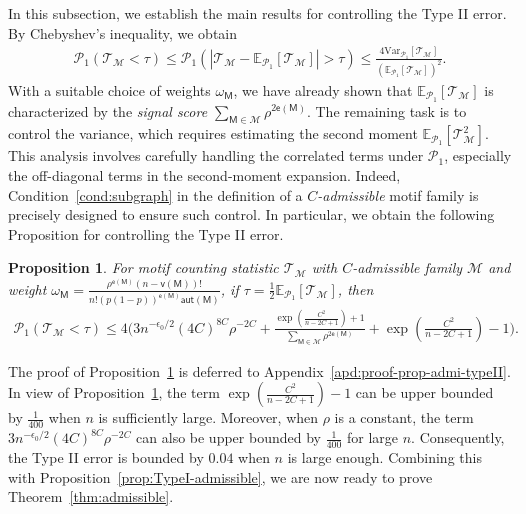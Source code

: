 \documentclass[letterpaper,11pt]{article}
\newtheorem{proposition}{Proposition}
\theoremstyle{definition}
\newcommand{\maM}{\mathcal{M}}
\newcommand{\maP}{\mathcal{P}}
\newcommand{\maT}{\mathcal{T}}
\newcommand{\en}{\mathsf{{e}}}
\newcommand{\vn}{\mathsf{{v}}}
\newcommand{\pth}[1]{\left( #1 \right)}
\newcommand{\qth}[1]{\left[ #1 \right]}
\newcommand{\sfM}{{\mathsf{M}}}
\newcommand{\aut}{\mathsf{aut}}
\def\var{\mathrm{Var}}
\def\E{\mathbb{E}}
\begin{document}
In this subsection, we establish the main results for controlling the Type II error. By Chebyshev's inequality, we obtain \begin{align*}
    \maP_1\pth{\maT_\maM<\tau} \le \maP_1\pth{\left| \maT_\maM-\E_{\maP_1}\qth{\maT_\maM}\right|>\tau}\le \frac{4\var_{\maP_1}\qth{\maT_\maM}}{\pth{\E_{\maP_1}\qth{\maT_\maM}}^2}.
\end{align*}
With a suitable choice of weights $\omega_\sfM$, we have already shown that $\E_{\maP_1}[\maT_\maM]$ is characterized by the \emph{signal score} $\sum_{\sfM\in \maM} \rho^{2\en(\sfM)}$. The remaining task is to control the variance, which requires estimating the second moment $\E_{\maP_1}[\maT_\maM^2]$. This analysis involves carefully handling the correlated terms under $\maP_1$, especially the off-diagonal terms in the second-moment expansion. Indeed, Condition~\ref{cond:subgraph} in the definition of a \emph{$C$-admissible} motif family is precisely designed to ensure such control. In particular, we obtain the following Proposition for controlling the Type II error.

\begin{proposition}\label{prop:admissible-TypeII}
    For motif counting statistic $\maT_\maM$ with \emph{$C$-admissible}  family $\maM$ and weight $\omega_\sfM = \frac{\rho^{\en(\sfM)}(n-\vn(\sfM))!}{n!(p(1-p))^{\en(\sfM)}\aut(\sfM)}$, if $\tau = \frac{1}{2}\E_{\maP_1}\qth{\maT_\maM}$, then \begin{align*}
        \maP_1\pth{\maT_\maM<\tau}\le 4\Bigg(3n^{-\epsilon_0/2}(4C)^{8C}\rho^{-2C}+\frac{\exp\pth{\frac{C^2}{n-2C+1}}+1}{\sum_{\sfM\in \maM}\rho^{2\en(\sfM)}}+\exp\pth{\frac{C^2}{n-2C+1}}-1\Bigg).
    \end{align*}
\end{proposition}
The proof of Proposition~\ref{prop:admissible-TypeII} is deferred to Appendix~\ref{apd:proof-prop-admi-typeII}. In view of Proposition~\ref{prop:admissible-TypeII}, the term $\exp\left(\tfrac{C^2}{n-2C+1}\right)-1$ can be upper bounded by $\tfrac{1}{400}$ when $n$ is sufficiently large. Moreover, when $\rho$ is a constant, the term $3n^{-\epsilon_0/2}(4C)^{8C}\rho^{-2C}$ can also be upper bounded by $\tfrac{1}{400}$ for large $n$. Consequently, the Type II error is bounded by $0.04$ when $n$ is large enough. Combining this with Proposition~\ref{prop:TypeI-admissible}, we are now ready to prove Theorem~\ref{thm:admissible}.
\end{document}

